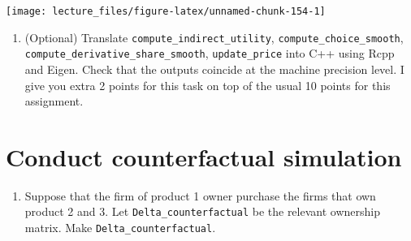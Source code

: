 \documentclass[]{book}
\newenvironment{Shaded}{\begin{snugshade}}{\end{snugshade}}
\newcommand{\KeywordTok}[1]{\textcolor[rgb]{0.13,0.29,0.53}{\textbf{#1}}}
\newcommand{\DataTypeTok}[1]{\textcolor[rgb]{0.13,0.29,0.53}{#1}}
\newcommand{\DecValTok}[1]{\textcolor[rgb]{0.00,0.00,0.81}{#1}}
\newcommand{\StringTok}[1]{\textcolor[rgb]{0.31,0.60,0.02}{#1}}
\newcommand{\CommentTok}[1]{\textcolor[rgb]{0.56,0.35,0.01}{\textit{#1}}}
\newcommand{\OperatorTok}[1]{\textcolor[rgb]{0.81,0.36,0.00}{\textbf{#1}}}
\newcommand{\NormalTok}[1]{#1}
\providecommand{\tightlist}{%
  \setlength{\itemsep}{0pt}\setlength{\parskip}{0pt}}
\begin{document}
\begin{Shaded}
\end{Shaded}

\begin{center}\texttt{[image: lecture\_files/figure-latex/unnamed-chunk-154-1]} \end{center}

\begin{enumerate}
\def\labelenumi{\arabic{enumi}.}
\setcounter{enumi}{1}
\tightlist
\item
  (Optional) Translate \texttt{compute\_indirect\_utility},
  \texttt{compute\_choice\_smooth},
  \texttt{compute\_derivative\_share\_smooth}, \texttt{update\_price}
  into C++ using Rcpp and Eigen. Check that the outputs coincide at the
  machine precision level. I give you extra 2 points for this task on
  top of the usual 10 points for this assignment.
\end{enumerate}

\section{Conduct counterfactual
simulation}\label{conduct-counterfactual-simulation}

\begin{enumerate}
\def\labelenumi{\arabic{enumi}.}
\tightlist
\item
  Suppose that the firm of product 1 owner purchase the firms that own
  product 2 and 3. Let \texttt{Delta\_counterfactual} be the relevant
  ownership matrix. Make \texttt{Delta\_counterfactual}.
\end{enumerate}
\end{document}
